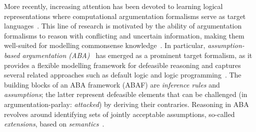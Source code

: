 \documentclass[letterpaper]{article} %
\begin{document}
More recently, 
increasing attention has been devoted to learning logical representations where computational argumentation formalisms serve as target languages~\cite{ProiettiT22,BengelTR24,AngelisPT24,NiskanenWJ19,PopescuW25}. 
This line of research is motivated by the ability 
of argumentation formalisms 
to reason with conflicting and uncertain information, 
making them well-suited for modelling commonsense knowledge~\cite{arguHandbookv1,RahwanIS09}.
In particular, \emph{assumption-based argumentation (ABA)}~\cite{BondarenkoDKT97} has emerged as a prominent target formalism, as it provides a flexible modelling framework for defeasible reasoning and captures several related approaches such as default logic and logic programming~\cite{BondarenkoDKT97,CaminadaSAD15a,CaminadaSAD15b}.
%
The building blocks of an ABA framework (ABAF) are \emph{inference rules} and \emph{assumptions}; the latter represent defeasible elements that can be challenged (in argumentation-parlay: \emph{attacked}) by deriving their contraries. Reasoning in ABA revolves around identifying sets of jointly acceptable assumptions, so-called \emph{extensions}, based on \emph{semantics}~\cite{BaroniCG18}.
%



\end{document}
